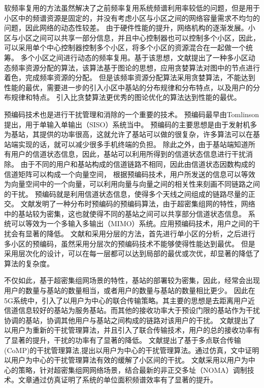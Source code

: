 软频率复用的方法虽然解决了之前频率复用系统频谱利用率较低的问题，但是用于小区中的频谱资源是固定的，并没有考虑小区与小区之间的网络容量需求不均匀的问题，因此网络的动态性较差。
由于硬件性能的提升，网络机构的逐渐发展。小区与小区之间可以共享一部分信息，并且中心控制器也可以控制多个小区，因此，可以采用单个中心控制器控制多个小区，将多个小区的资源混合在一起做一个统筹。
多个小区之间进行动态的频率复用。基于该思想，文献\cite{4LRA}提出了一种多小区动态频率资源分配的算法，该算法基于图论的思想，应用贪婪算法对图中的节点进行着色，完成频率资源的分配。
但是该频率资源分配算法采用贪婪算法，不能达到性能的最优，需要进一步的引入小区中基站的分布规律和分布特点，以及用户的分布规律和特点。
引入比贪婪算法更优秀的图论优化的算法达到性能的最优。

预编码技术也是进行干扰管理和消除的一个重要的技术。
预编码最早由Tomlinson提出，用于单输入单输出（SISO）系统当中。
预编码的主要思想是由于发射机多为基站，其提供的功率很高，这就允许了基站可以做的很复杂，许多算法可以在基站端实现的话，就可以减少很多手机终端的负担。
除此之外，由于基站端知道所有用户的信道状态信息，因此，基站可以利用所得到的信道状态信息进行干扰消除。
由于不同的用户和基站构成的信道链路不相同，因此由信道状态因数构成的信道矩阵可以构成一个向量空间，
根据预编码技术，用户所发送的信息可以等效为向量空间中的一个向量，可以利用向量与向量之间的相关性来刻画不同链路之间的干扰。
预编码就是利用信道状态信息，使得多个天线之间组成的链路尽量的正交。
文献\cite{DisPrecode}发明了一种分布时预编码的预编码算法，由于超密集组网的特性，网络中的基站较为密集，这也就使得不同的基站之间可以共享部分信道状态信息。
系统可以等效为一个多输入多输出（MIMO）系统。应用预编码技术，用户之间的干扰会有显著的降低。
文献\cite{LayerPrecode}和\cite{Layer2Precode}采用分层的方法，首先进行单小区的分析，之后进行多小区的预编码，虽然采用分层次的预编码技术不能够使得性能达到最优。
但是采用层次化的设计，可以在每一层都可以达到局部的最优或次优，却显著的降低了算法的复杂度。

不仅如此，基于超密集组网场景的特性，基站的部署较为密集，因此，经常会出现用户的数量与基站的数量相当，或者用户的数量与基站的数量相比更少。
因此在5G系统中，引入了以用户为中心的联合传输策略。其主要的思想是去距离用户近信道信息较好的基站为服务基站。而其他的接收功率大于预设门限的基站作为干扰协调的基站，协调其他用户与基站之间构成的链路对该用户的干扰。
文献\cite{Ucent}提出了以用户为重新的干扰管理算法，并且引入了联合传输技术，用户的总的接收功率有了显著的提升，干扰的功率有了显著的降低。
文献\cite{CoMPUDN}提出了基于多点联合传输(CoMP)的干扰管理算法,提出以用户为中心的干扰管理算法。通过仿真，文中证明以用户为中心的干扰管理算法有效的缓解了小区间的干扰。
文献\cite{UNOMAcent}采用以用户为中心的策略，针对超密集组网网络场景，结合最新的非正交多址（NOMA）调制技术。文章通过仿真证明了系统的单位面积频谱效率有了显著的提升。

